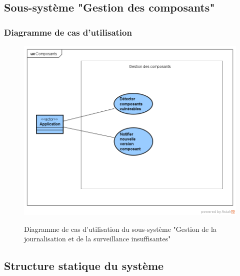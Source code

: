 \subsection{Sous-système "Gestion des composants"}
\subsubsection{Diagramme de cas d'utilisation}
\begin{figure}[H]
	\centering
	\begin{minipage}{12cm}
		\centering
		{\includegraphics[height=0.35\textheight, width=1\textwidth]{fig/Composants-use-case-diagram.png}}
	\end{minipage}
	\caption{Diagramme de cas d'utilisation du sous-système "Gestion de la journalisation et de la surveillance insuffisantes"}
	\label{fig:7.20}
\end{figure}
\subsection{Structure statique du système}
